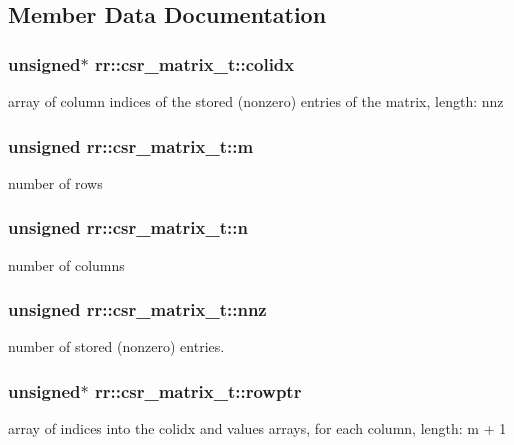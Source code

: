 \subsection{Member Data Documentation}
\hypertarget{structrr_1_1csr__matrix__t_aef6ab9aaaba240f9ad7d333bca1ff71a}{
\subsubsection[{colidx}]{\setlength{\rightskip}{0pt plus 5cm}unsigned$\ast$ rr\-::csr\-\_\-matrix\-\_\-t\-::colidx}}\label{structrr_1_1csr__matrix__t_aef6ab9aaaba240f9ad7d333bca1ff71a}
array of column indices of the stored (nonzero) entries of the matrix, length\-: nnz \hypertarget{structrr_1_1csr__matrix__t_a649049dcf50b83aba245e008d4991038}{
\subsubsection[{m}]{\setlength{\rightskip}{0pt plus 5cm}unsigned rr\-::csr\-\_\-matrix\-\_\-t\-::m}}\label{structrr_1_1csr__matrix__t_a649049dcf50b83aba245e008d4991038}
number of rows \hypertarget{structrr_1_1csr__matrix__t_af55d6f915237d4fbf1d99d515abce8a5}{
\subsubsection[{n}]{\setlength{\rightskip}{0pt plus 5cm}unsigned rr\-::csr\-\_\-matrix\-\_\-t\-::n}}\label{structrr_1_1csr__matrix__t_af55d6f915237d4fbf1d99d515abce8a5}
number of columns \hypertarget{structrr_1_1csr__matrix__t_a18c05b074c76a960debc0cfa33b8757a}{
\subsubsection[{nnz}]{\setlength{\rightskip}{0pt plus 5cm}unsigned rr\-::csr\-\_\-matrix\-\_\-t\-::nnz}}\label{structrr_1_1csr__matrix__t_a18c05b074c76a960debc0cfa33b8757a}
number of stored (nonzero) entries. \hypertarget{structrr_1_1csr__matrix__t_ac4f924004760ce3905ab171a054813c0}{
\subsubsection[{rowptr}]{\setlength{\rightskip}{0pt plus 5cm}unsigned$\ast$ rr\-::csr\-\_\-matrix\-\_\-t\-::rowptr}}\label{structrr_1_1csr__matrix__t_ac4f924004760ce3905ab171a054813c0}
array of indices into the colidx and values arrays, for each column, length\-: m + 1

